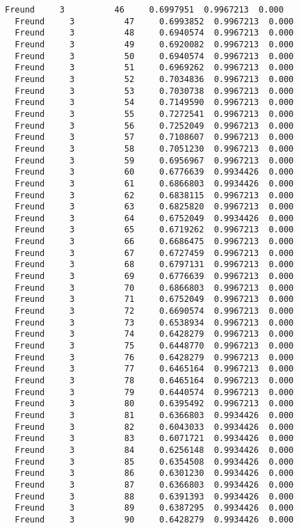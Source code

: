 \documentclass[11pt]{article}
\begin{document}
\begin{Verbatim}[commandchars=\\\{\}]
  Freund     3          46     0.6997951  0.9967213  0.000
  Freund     3          47     0.6993852  0.9967213  0.000
  Freund     3          48     0.6940574  0.9967213  0.000
  Freund     3          49     0.6920082  0.9967213  0.000
  Freund     3          50     0.6940574  0.9967213  0.000
  Freund     3          51     0.6969262  0.9967213  0.000
  Freund     3          52     0.7034836  0.9967213  0.000
  Freund     3          53     0.7030738  0.9967213  0.000
  Freund     3          54     0.7149590  0.9967213  0.000
  Freund     3          55     0.7272541  0.9967213  0.000
  Freund     3          56     0.7252049  0.9967213  0.000
  Freund     3          57     0.7108607  0.9967213  0.000
  Freund     3          58     0.7051230  0.9967213  0.000
  Freund     3          59     0.6956967  0.9967213  0.000
  Freund     3          60     0.6776639  0.9934426  0.000
  Freund     3          61     0.6866803  0.9934426  0.000
  Freund     3          62     0.6838115  0.9967213  0.000
  Freund     3          63     0.6825820  0.9967213  0.000
  Freund     3          64     0.6752049  0.9934426  0.000
  Freund     3          65     0.6719262  0.9967213  0.000
  Freund     3          66     0.6686475  0.9967213  0.000
  Freund     3          67     0.6727459  0.9967213  0.000
  Freund     3          68     0.6797131  0.9967213  0.000
  Freund     3          69     0.6776639  0.9967213  0.000
  Freund     3          70     0.6866803  0.9967213  0.000
  Freund     3          71     0.6752049  0.9967213  0.000
  Freund     3          72     0.6690574  0.9967213  0.000
  Freund     3          73     0.6538934  0.9967213  0.000
  Freund     3          74     0.6428279  0.9967213  0.000
  Freund     3          75     0.6448770  0.9967213  0.000
  Freund     3          76     0.6428279  0.9967213  0.000
  Freund     3          77     0.6465164  0.9967213  0.000
  Freund     3          78     0.6465164  0.9967213  0.000
  Freund     3          79     0.6440574  0.9967213  0.000
  Freund     3          80     0.6395492  0.9967213  0.000
  Freund     3          81     0.6366803  0.9934426  0.000
  Freund     3          82     0.6043033  0.9934426  0.000
  Freund     3          83     0.6071721  0.9934426  0.000
  Freund     3          84     0.6256148  0.9934426  0.000
  Freund     3          85     0.6354508  0.9934426  0.000
  Freund     3          86     0.6301230  0.9934426  0.000
  Freund     3          87     0.6366803  0.9934426  0.000
  Freund     3          88     0.6391393  0.9934426  0.000
  Freund     3          89     0.6387295  0.9934426  0.000
  Freund     3          90     0.6428279  0.9934426  0.000

\end{Verbatim}
\end{document}
